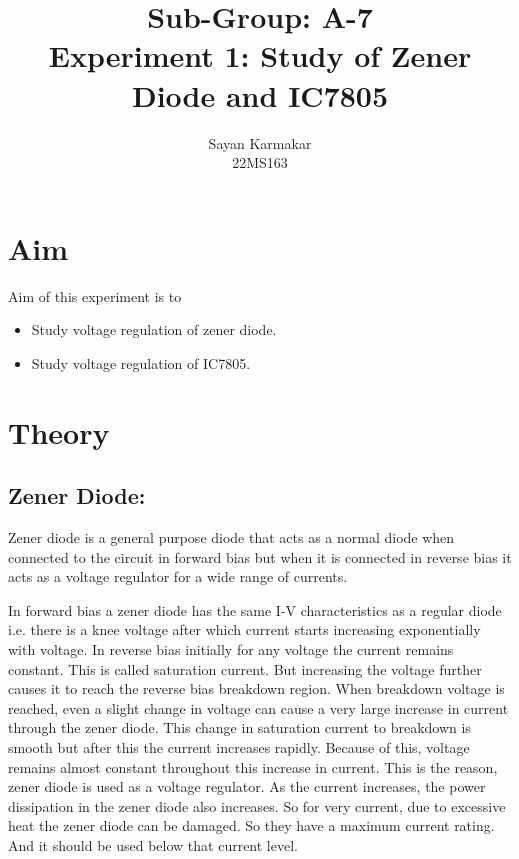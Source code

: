 \documentclass[12pt]{article}
\begin{document}
\title{Sub-Group: A-7 \\ Experiment 1: Study of Zener Diode and IC7805}


\author{Sayan Karmakar \\22MS163 }
\date{}
\maketitle

\section{Aim}
Aim of this experiment is to
\begin{itemize}
    \item Study voltage regulation of zener diode.
    \item Study voltage regulation of IC7805.
\end{itemize}

\section{Theory}
\subsection{Zener Diode:}
Zener diode is a general purpose diode that acts as a normal diode when connected to the circuit in forward bias but when it is connected in reverse bias it acts as a voltage regulator for a wide range of currents.

In forward bias a zener diode has the same I-V characteristics as a  regular diode i.e. there is a knee voltage after which current starts increasing exponentially with voltage. In reverse bias initially for any voltage the current remains constant. This is called saturation current. But increasing the voltage further causes it to reach the reverse bias breakdown region. When breakdown voltage is reached, even a slight change in voltage can cause a very large increase in current through the zener diode. This change in saturation current to breakdown is smooth but after this the current increases rapidly. Because of this, voltage remains almost constant throughout this increase in current. This is the reason, zener diode is used as a voltage regulator.
As the current increases, the power dissipation in the zener diode also increases. So for very current, due to excessive heat the zener diode can be damaged. So they have a maximum current rating. And it should be used below that current level.
\end{document}
